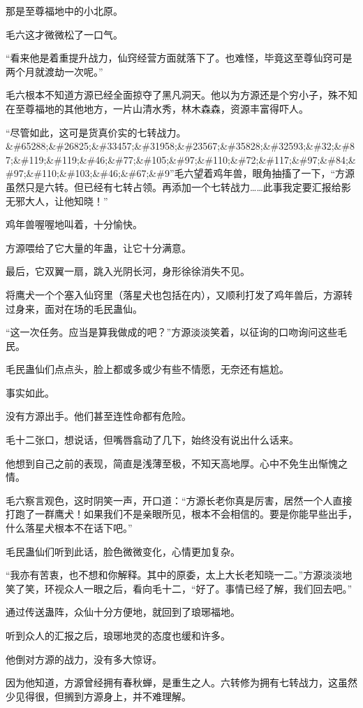 \begin{this_body}
那是至尊福地中的小北原。

毛六这才微微松了一口气。

“看来他是着重提升战力，仙窍经营方面就落下了。也难怪，毕竟这至尊仙窍可是两个月就渡劫一次呢。”

毛六根本不知道方源已经全面掠夺了黑凡洞天。他以为方源还是个穷小子，殊不知在至尊福地的其他地方，一片山清水秀，林木森森，资源丰富得吓人。

“尽管如此，这可是货真价实的七转战力。\&\#65288;\&\#26825;\&\#33457;\&\#31958;\&\#23567;\&\#35828;\&\#32593;\&\#32;\&\#87;\&\#119;\&\#119;\&\#46;\&\#77;\&\#105;\&\#97;\&\#110;\&\#72;\&\#117;\&\#97;\&\#84;\&\#97;\&\#110;\&\#103;\&\#46;\&\#67;\&\#9”毛六望着鸡年兽，眼角抽搐了一下，“方源虽然只是六转。但已经有七转占领。再添加一个七转战力……此事我定要汇报给影无邪大人，让他知晓！”

鸡年兽喔喔地叫着，十分愉快。

方源喂给了它大量的年蛊，让它十分满意。

最后，它双翼一扇，跳入光阴长河，身形徐徐消失不见。

将鹰犬一个个塞入仙窍里（落星犬也包括在内），又顺利打发了鸡年兽后，方源转过身来，面对在场的毛民蛊仙。

“这一次任务。应当是算我做成的吧？”方源淡淡笑着，以征询的口吻询问这些毛民。

毛民蛊仙们点点头，脸上都或多或少有些不情愿，无奈还有尴尬。

事实如此。

没有方源出手。他们甚至连性命都有危险。

毛十二张口，想说话，但嘴唇翕动了几下，始终没有说出什么话来。

他想到自己之前的表现，简直是浅薄至极，不知天高地厚。心中不免生出惭愧之情。

毛六察言观色，这时阴笑一声，开口道：“方源长老你真是厉害，居然一个人直接打跑了一群鹰犬！如果我们不是亲眼所见，根本不会相信的。要是你能早些出手，什么落星犬根本不在话下吧。”

毛民蛊仙们听到此话，脸色微微变化，心情更加复杂。

“我亦有苦衷，也不想和你解释。其中的原委，太上大长老知晓一二。”方源淡淡地笑了笑，环视众人一眼之后，看向毛十二，“好了。事情已经了解，我们回去吧。”

通过传送蛊阵，众仙十分方便地，就回到了琅琊福地。

听到众人的汇报之后，琅琊地灵的态度也缓和许多。

他倒对方源的战力，没有多大惊讶。

因为他知道，方源曾经拥有春秋蝉，是重生之人。六转修为拥有七转战力，这虽然少见得很，但搁到方源身上，并不难理解。


\end{this_body}
